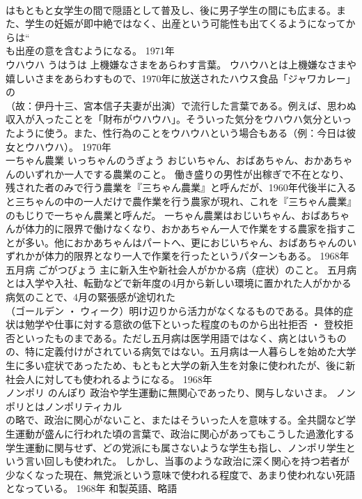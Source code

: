 \documentclass[8pt]{extreport}
\begin{document}
\begin{CJK}{UTF8}{min}
\\	はもともと女学生の間で隠語として普及し、後に男子学生の間にも広まる。また、学生の妊娠が即中絶ではなく、出産という可能性も出てくるようになってからは“
\\	も出産の意を含むようになる。	1971年	
\\	ウハウハ	うはうは	上機嫌なさまをあらわす言葉。	ウハウハとは上機嫌なさまや嬉しいさまをあらわすもので、1970年に放送されたハウス食品「ジャワカレー」の
\\	（故：伊丹十三、宮本信子夫妻が出演）で流行した言葉である。例えば、思わぬ収入が入ったことを「財布がウハウハ」。そういった気分をウハウハ気分といったように使う。また、性行為のことをウハウハという場合もある（例：今日は彼女とウハウハ）。	1970年	
\\	一ちゃん農業	いっちゃんのうぎょう	おじいちゃん、おばあちゃん、おかあちゃんのいずれか一人でする農業のこと。	働き盛りの男性が出稼ぎで不在となり、残された者のみで行う農業を『三ちゃん農業』と呼んだが、1960年代後半に入ると三ちゃんの中の一人だけで農作業を行う農家が現れ、これを『三ちゃん農業』のもじりで一ちゃん農業と呼んだ。 一ちゃん農業はおじいちゃん、おばあちゃんが体力的に限界で働けなくなり、おかあちゃん一人で作業をする農家を指すことが多い。他におかあちゃんはパートへ、更におじいちゃん、おばあちゃんのいずれかが体力的限界となり一人で作業を行ったというパターンもある。	1968年	
\\	五月病	ごがつびょう	主に新入生や新社会人がかかる病（症状）のこと。	五月病とは入学や入社、転勤などで新年度の4月から新しい環境に置かれた人がかかる病気のことで、4月の緊張感が途切れた
\\	（ゴールデン ・ ウィーク）明け辺りから活力がなくなるものである。具体的症状は勉学や仕事に対する意欲の低下といった程度のものから出社拒否 ・ 登校拒否といったものまである。ただし五月病は医学用語ではなく、病とはいうものの、特に定義付けがされている病気ではない。五月病は一人暮らしを始めた大学生に多い症状であったため、もともと大学の新入生を対象に使われたが、後に新社会人に対しても使われるようになる。	1968年	
\\	ノンポリ	のんぽり	政治や学生運動に無関心であったり、関与しないさま。	ノンポリとはノンポリティカル
\\	の略で、政治に関心がないこと、またはそういった人を意味する。全共闘など学生運動が盛んに行われた頃の言葉で、政治に関心があってもこうした過激化する学生運動に関与せず、どの党派にも属さないような学生も指し、ノンポリ学生という言い回しも使われた。 しかし、当事のような政治に深く関心を持つ若者が少なくなった現在、無党派という意味で使われる程度で、あまり使われない死語となっている。	1968年	和製英語、略語	

\end{CJK}
\end{document}
